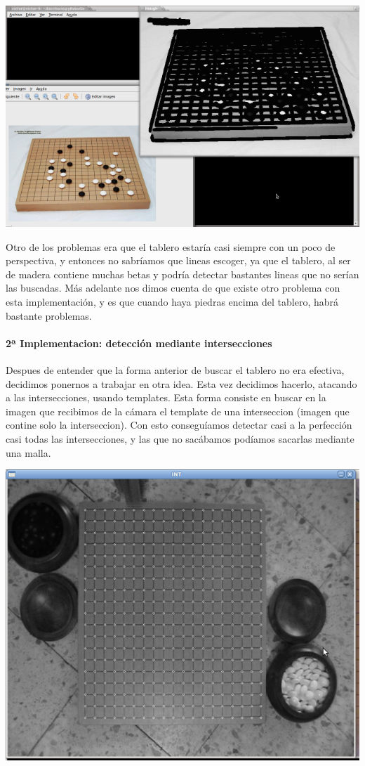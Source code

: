\documentclass[12pt,a4paper]{report}
\begin{document}
\includegraphics[scale=0.6]{detect-lineas.png}


Otro de los problemas era que el tablero estaría casi siempre con un poco de
perspectiva, y entonces no sabríamos que lineas escoger, ya que el tablero, al
ser de madera contiene muchas betas y podría detectar bastantes lineas que no
serían las buscadas. 
Más adelante nos dimos cuenta de que existe otro problema con esta
implementación, y es que cuando haya piedras encima del tablero, habrá bastante
problemas. 
 

\paragraph{2ª Implementacion: detección mediante intersecciones}

Despues de entender que la forma anterior de buscar el tablero no era efectiva,
decidimos ponernos a trabajar en otra idea. Esta vez decidimos hacerlo, atacando
a las intersecciones, usando templates. Esta forma consiste en buscar en la
imagen que recibimos de la cámara el template de una interseccion (imagen
que contine solo la interseccion). Con esto conseguíamos detectar casi a la
perfección casi todas las intersecciones, y las que no sacábamos podíamos
sacarlas mediante una malla. 

\includegraphics[scale=0.6]{detec-intersecciones.png}
\end{document}

